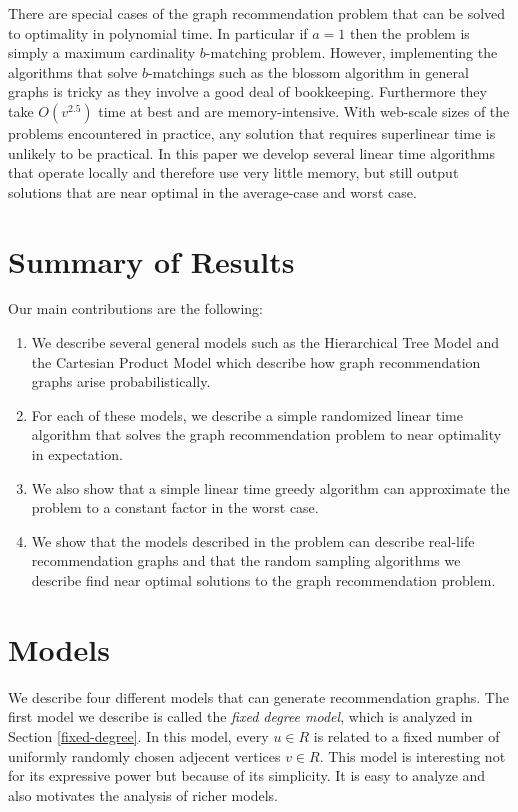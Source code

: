\documentclass[]{article}
\begin{document}
There are special cases of the graph recommendation problem that can
be solved to optimality in polynomial time. In particular if $a=1$
then the problem is simply a maximum cardinality $b$-matching
problem. However, implementing the algorithms that solve $b$-matchings
such as the blossom algorithm in general graphs is tricky as they
involve a good deal of bookkeeping. Furthermore they take $O(v^{2.5})$
time at best and are memory-intensive. With web-scale sizes of the
problems encountered in practice, any solution that requires
superlinear time is unlikely to be practical. In this paper we
develop several linear time algorithms that operate locally and
therefore use very little memory, but still output solutions
that are near optimal in the average-case and worst case.

\section{Summary of Results}
Our main contributions are the following:
\begin{enumerate}

\item We describe several general models such as the Hierarchical Tree
  Model and the Cartesian Product Model which describe how graph
  recommendation graphs arise probabilistically.

\item For each of these models, we describe a simple randomized linear
  time algorithm that solves the graph recommendation problem to near
  optimality in expectation.

\item We also show that a simple linear time greedy algorithm can
  approximate the problem to a constant factor in the worst case.

\item We show that the models described in the problem can describe
  real-life recommendation graphs and that the random sampling
  algorithms we describe find near optimal solutions to the graph
  recommendation problem.
\end{enumerate}

\section{Models}
We describe four different models that can generate recommendation
graphs. The first model we describe is called the {\em fixed degree
model}, which is analyzed in Section \ref{fixed-degree}. In this
model, every $u\in R$ is related to a fixed number of uniformly
randomly chosen adjecent vertices $v\in R$. This model is interesting
not for its expressive power but because of its simplicity.  It is
easy to analyze and also motivates the analysis of richer models.
\end{document}
